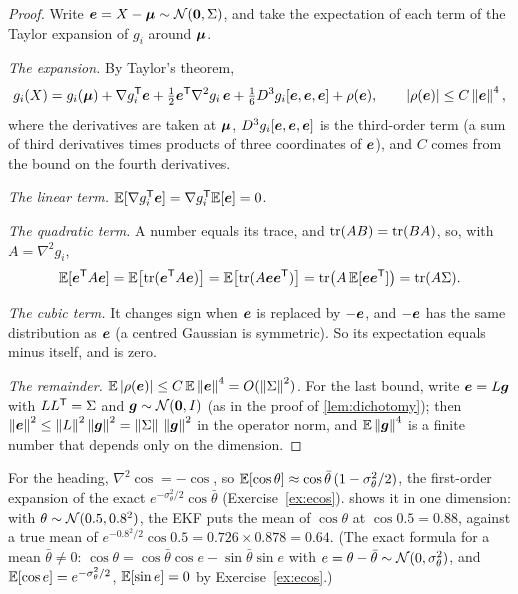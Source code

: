 \begin{proof}
Write $\bm{e}=X-\bm{\mu}\sim\mathcal{N}(\bm{0},\Sigma)$, and take the expectation
of each term of the Taylor expansion of $g_i$ around $\bm{\mu}$.

\emph{The expansion.} By Taylor's theorem,
\[
  g_i(X)=g_i(\bm{\mu})+\nabla g_i^{\mathsf{T}}\bm{e}+\tfrac12\bm{e}^{\mathsf{T}}\nabla^2g_i\,
  \bm{e}+\tfrac16D^3g_i[\bm{e},\bm{e},\bm{e}]+\rho(\bm{e}),
  \qquad\left\lvert \rho(\bm{e})\right\rvert\le C\left\lVert \bm{e}\right\rVert^4,
\]
where the derivatives are taken at $\bm{\mu}$, $D^3g_i[\bm{e},\bm{e},\bm{e}]$ is the third-order term (a sum of third derivatives times products of
three coordinates of $\bm{e}$), and $C$ comes from the bound on the
fourth derivatives.

\emph{The linear term.} $\mathbb{E}[\nabla g_i^{\mathsf{T}}\bm{e}]=\nabla g_i^{\mathsf{T}}\mathbb{E}[\bm{e}]
=0$.

\emph{The quadratic term.} A number equals its trace, and
$\operatorname{tr}(AB)=\operatorname{tr}(BA)$, so, with $A=\nabla^2g_i$,
\[
  \mathbb{E}[\bm{e}^{\mathsf{T}} A\bm{e}]=\mathbb{E}\bigl[\operatorname{tr}(\bm{e}^{\mathsf{T}} A\bm{e})\bigr]
  =\mathbb{E}\bigl[\operatorname{tr}(A\bm{e}\bm{e}^{\mathsf{T}})\bigr]
  =\operatorname{tr}\bigl(A\,\mathbb{E}[\bm{e}\bm{e}^{\mathsf{T}}]\bigr)=\operatorname{tr}(A\Sigma) .
\]

\emph{The cubic term.} It changes sign when $\bm{e}$ is replaced by
$-\bm{e}$, and $-\bm{e}$ has the same distribution as $\bm{e}$ (a
centred Gaussian is symmetric). So its expectation equals minus itself,
and is zero.

\emph{The remainder.} $\mathbb{E}\left\lvert \rho(\bm{e})\right\rvert\le C\,\mathbb{E}\left\lVert \bm{e}\right\rVert^4
=O(\left\lVert \Sigma\right\rVert^2)$.
For the last bound, write $\bm{e}=L\bm{g}$ with $LL^{\mathsf{T}}=\Sigma$ and
$\bm{g}\sim\mathcal{N}(\bm{0},I)$ (as in the proof of
\cref{lem:dichotomy}); then $\left\lVert \bm{e}\right\rVert^2\le\left\lVert L\right\rVert^2\left\lVert \bm{g}\right\rVert^2
=\left\lVert \Sigma\right\rVert\,\left\lVert \bm{g}\right\rVert^2$ in the operator norm, and
$\mathbb{E}\left\lVert \bm{g}\right\rVert^4$ is a finite number that depends only on the
dimension.
\end{proof}

For the heading, $\nabla^2\cos=-\cos$, so $\mathbb{E}[\cos\theta]\approx
\cos\bar\theta\,(1-\sigma_\theta^2/2)$, the first-order expansion of the
exact $e^{-\sigma_\theta^2/2}\cos\bar\theta$ (Exercise~\ref{ex:ecos}).
 shows it in one dimension: with
$\theta\sim\mathcal{N}(0.5,0.8^2)$, the EKF puts the mean of $\cos\theta$ at
$\cos0.5=0.88$, against a true mean of
$e^{-0.8^2/2}\cos0.5=0.726\times0.878=0.64$. (The exact formula for a
mean $\bar\theta\ne0$: $\cos\theta=\cos\bar\theta\cos e-\sin\bar\theta
\sin e$ with $e=\theta-\bar\theta\sim\mathcal{N}(0,\sigma_\theta^2)$, and
$\mathbb{E}[\cos e]=e^{-\sigma_\theta^2/2}$, $\mathbb{E}[\sin e]=0$ by
Exercise~\ref{ex:ecos}.)

